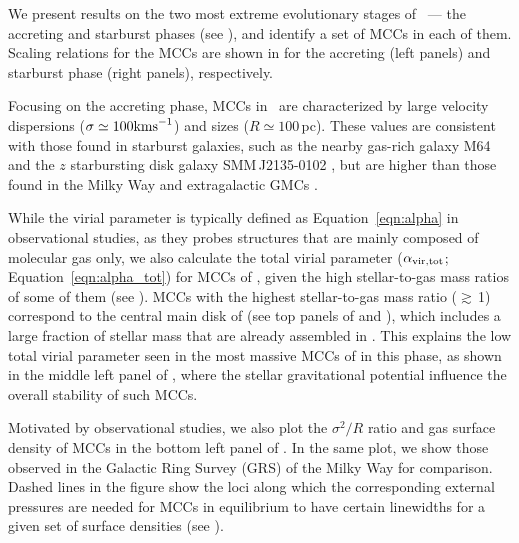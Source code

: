 \IfFileExists{emulateapjlegacy.cls}{\documentclass[iop]{emulateapjlegacy}}{\documentclass[iop]{emulateapj}}
\begin{document}
We present results on the two most extreme evolutionary stages of \flower\ --- the accreting and starburst phases (see ), 
and identify a set of MCCs in each of them. 
Scaling relations for the MCCs are shown in  for the accreting (left panels) and starburst phase (right panels), respectively. 

Focusing on the accreting phase, MCCs in \flower\ are characterized by large velocity dispersions ($\sigma \simeq 100 {\rm km s}^{-1}$) 
and sizes ($R\simeq 100$\,pc). These values are consistent with those found in starburst galaxies, 
such as the nearby gas-rich galaxy M64 and 
the $z$ starbursting disk galaxy SMM\,J2135-0102 %
\citep{Rosolowsky05a, Swinbank11a}, but are higher than those found in the Milky Way and extragalactic GMCs \citep{Heyer04a, Bolatto08a}.

While the virial parameter is typically defined as Equation~\ref{eqn:alpha} in observational studies, as they probes structures that are 
mainly composed of molecular gas only, we also calculate the total virial parameter ($\alpha_{\rm vir, tot}$; Equation~\ref{eqn:alpha_tot}) 
for MCCs of \flower, given the high stellar-to-gas mass ratios of some of them (see ). 
MCCs with the highest stellar-to-gas mass ratio ($\gtrsim$\,1) correspond to the central main disk of \flower (see top panels of 
 and ), which includes a large fraction of stellar mass that are already assembled in \flower. 
This explains the low total virial parameter seen in the most massive MCCs of \flower in this phase, as shown in
the middle left panel of , where the stellar gravitational potential influence the overall stability of such MCCs.

Motivated by observational studies, we also plot the $\sigma^2/R$ ratio and gas surface density of MCCs in the bottom left panel of .
In the same plot, we show those observed in the Galactic Ring Survey (GRS) of the Milky Way \citep{Heyer09a} for comparison.
Dashed lines in the figure show the loci along which the corresponding external pressures are needed for MCCs in equilibrium to have certain 
linewidths for a given set of surface densities (see ).
\end{document}
